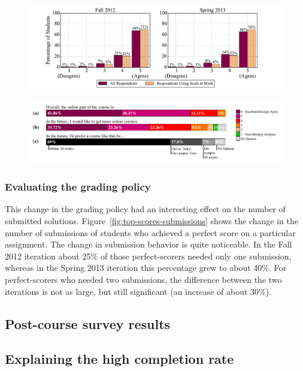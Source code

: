 \documentclass{sig-alternate}
\begin{document}
\begin{figure}[ht!]
  \centering
  \includegraphics[width=\textwidth]{plots/worth-it-apply-it.pdf}
  \caption{}
  \label{fig:worth-it-apply-it}
\end{figure}

\begin{figure}[ht!]
  \centering
  \includegraphics[width=\textwidth]{plots/epfl-course-eval.pdf}
  \caption{}
  \label{fig:epfl-course-eval}
\end{figure}


\subsubsection{Evaluating the grading policy}\label{sec:eval-grading-policy}

This change in the grading policy had an interesting effect on the number of
submitted solutions. Figure~\ref{fig:top-scores-submissions} shows the change
in the number of submissions of students who achieved a perfect score on a
particular assignment. The change in submission behavior is quite noticeable.
In the Fall 2012 iteration about 25\% of those perfect-scorers needed only one
submission, whereas in the Spring 2013 iteration this percentage grew to about
40\%. For perfect-scorers who needed two submissions, the difference between
the two iterations is not as large, but still significant (an increase of
about 30\%).

\subsection{Post-course survey results}


\subsection{Explaining the high completion rate}
\end{document}
